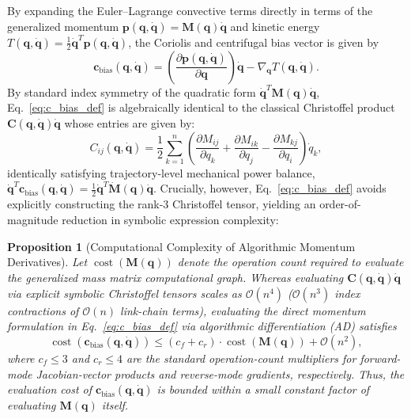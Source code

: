 \documentclass[fleqn,10pt]{article}
\newtheorem{proposition}{Proposition}
\begin{document}
	By expanding the Euler--Lagrange convective terms directly in terms of the generalized momentum $\bm{p}(\bm{q},\dot{\bm{q}}) = \bm{M}(\bm{q})\dot{\bm{q}}$ and kinetic energy $T(\bm{q},\dot{\bm{q}}) = \frac{1}{2}\dot{\bm{q}}^T\bm{p}(\bm{q},\dot{\bm{q}})$, the Coriolis and centrifugal bias vector is given by
	\begin{equation}
		\bm{c}_{\mathrm{bias}}(\bm{q},\dot{\bm{q}}) = \left(\frac{\partial \bm{p}(\bm{q},\dot{\bm{q}})}{\partial \bm{q}}\right)\dot{\bm{q}} - \nabla_{\bm{q}} T(\bm{q},\dot{\bm{q}}).
		\label{eq:c_bias_def}
	\end{equation}
	By standard index symmetry of the quadratic form $\dot{\bm{q}}^T\bm{M}(\bm{q})\dot{\bm{q}}$, Eq.~\eqref{eq:c_bias_def} is algebraically identical to the classical Christoffel product $\bm{C}(\bm{q},\dot{\bm{q}})\dot{\bm{q}}$ whose entries are given by:
	\begin{equation}
		C_{ij}(\bm{q},\dot{\bm{q}}) = \frac{1}{2}\sum_{k=1}^n \left( \frac{\partial M_{ij}}{\partial q_k} + \frac{\partial M_{ik}}{\partial q_j} - \frac{\partial M_{kj}}{\partial q_i} \right)\dot{q}_k,
		\label{eq:christoffel_classical}
	\end{equation}
	identically satisfying trajectory-level mechanical power balance, $\dot{\bm{q}}^T\bm{c}_{\mathrm{bias}}(\bm{q},\dot{\bm{q}}) = \frac{1}{2}\dot{\bm{q}}^T\dot{\bm{M}}(\bm{q})\dot{\bm{q}}$. Crucially, however, Eq.~\eqref{eq:c_bias_def} avoids explicitly constructing the rank-3 Christoffel tensor, yielding an order-of-magnitude reduction in symbolic expression complexity:
	
	\begin{proposition}[Computational Complexity of Algorithmic Momentum Derivatives]
		\label{thm:complexity}
		Let $\operatorname{cost}(\bm{M}(\bm{q}))$ denote the operation count required to evaluate the generalized mass matrix computational graph. Whereas evaluating $\bm{C}(\bm{q},\dot{\bm{q}})\dot{\bm{q}}$ via explicit symbolic Christoffel tensors scales as $\mathcal{O}(n^4)$ ($\mathcal{O}(n^3)$ index contractions of $\mathcal{O}(n)$ link-chain terms), evaluating the direct momentum formulation in Eq.~\eqref{eq:c_bias_def} via algorithmic differentiation (AD) satisfies
		\begin{equation}
			\operatorname{cost}(\bm{c}_{\mathrm{bias}}(\bm{q},\dot{\bm{q}})) \le (c_f + c_r) \cdot \operatorname{cost}(\bm{M}(\bm{q})) + \mathcal{O}(n^2),
			\label{eq:ad_cost_bound}
		\end{equation}
		where $c_f \le 3$ and $c_r \le 4$ are the standard operation-count multipliers for forward-mode Jacobian-vector products and reverse-mode gradients, respectively. Thus, the evaluation cost of $\bm{c}_{\mathrm{bias}}(\bm{q},\dot{\bm{q}})$ is bounded within a small constant factor of evaluating $\bm{M}(\bm{q})$ itself.
	\end{proposition}
	
\end{document}
